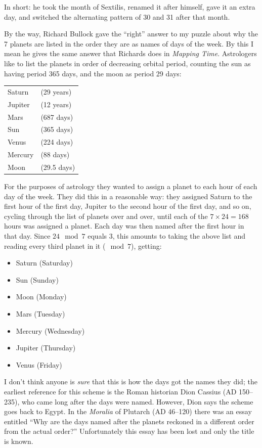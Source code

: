 \documentclass{article}
\def\tightlist{}
\begin{document}
In short: he took the month of Sextilis, renamed it after himself, gave
it an extra day, and switched the alternating pattern of 30 and 31 after
that month.

By the way, Richard Bullock gave the ``right'' answer to my puzzle about
why the 7 planets are listed in the order they are as names of days of
the week. By this I mean he gives the same answer that Richards does in
\emph{Mapping Time}. Astrologers like to list the planets in order of
decreasing orbital period, counting the sun as having period 365 days,
and the moon as period 29 days:

\begin{longtable}[]{@{}ll@{}}
\toprule
\endhead
Saturn & (29 years)\tabularnewline
Jupiter & (12 years)\tabularnewline
Mars & (687 days)\tabularnewline
Sun & (365 days)\tabularnewline
Venus & (224 days)\tabularnewline
Mercury & (88 days)\tabularnewline
Moon & (29.5 days)\tabularnewline
\bottomrule
\end{longtable}

For the purposes of astrology they wanted to assign a planet to each
hour of each day of the week. They did this in a reasonable way: they
assigned Saturn to the first hour of the first day, Jupiter to the
second hour of the first day, and so on, cycling through the list of
planets over and over, until each of the \(7 \times 24 = 168\) hours was
assigned a planet. Each day was then named after the first hour in that
day. Since \(24 \mod 7\) equals \(3\), this amounts to taking the above
list and reading every third planet in it (\(\mod 7\)), getting:

\begin{itemize}
\tightlist
\item
  Saturn (Saturday)
\item
  Sun (Sunday)
\item
  Moon (Monday)
\item
  Mars (Tuesday)
\item
  Mercury (Wednesday)
\item
  Jupiter (Thursday)
\item
  Venus (Friday)
\end{itemize}

I don't think anyone is \emph{sure} that this is how the days got the
names they did; the earliest reference for this scheme is the Roman
historian Dion Cassius (AD 150--235), who came long after the days were
named. However, Dion says the scheme goes back to Egypt. In the
\emph{Moralia} of Plutarch (AD 46--120) there was an essay entitled
``Why are the days named after the planets reckoned in a different order
from the actual order?'' Unfortunately this essay has been lost and only
the title is known.
\end{document}
